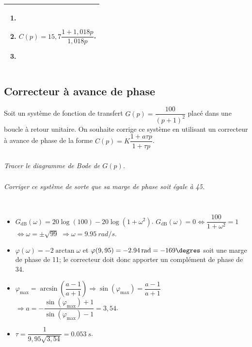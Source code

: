 \documentclass[10pt,fleqn]{article} %
\begin{document}
\begin{multicols}{2}
\noindent
\begin{tabular}{|p{.9\linewidth}|}
\hline
\begin{enumerate}
\item $\quad$
\item $C(p)=15,7\dfrac{1+1,018p}{1,018p}$.
\item $\quad$
\end{enumerate}\\
\hline
\end{tabular}





\subsection*{Correcteur à avance de phase}
\setcounter{exo}{0}
Soit un système de fonction de transfert $G(p)=\dfrac{100}{\left(p+1\right)^2}$ placé dans une boucle à retour unitaire. On souhaite corrige ce système en utilisant un correcteur à avance de phase de la forme $C(p)=K\dfrac{1+a\tau p}{1+\tau p}$.


\subparagraph{}\textit{Tracer le diagramme de Bode de $G(p)$.}


\subparagraph{}\textit{Corriger ce système de sorte que sa marge de phase soit égale à 45\degres.}
\ifprof
\begin{corrige}~\\
\begin{itemize}
\item $G_{\text{dB}}(\omega)=20\log \left(100\right)-20\log\left(1+\omega^2\right)$. $G_{\text{dB}}(\omega)=0 \Leftrightarrow \dfrac{100}{1+\omega^2}=1$ $  \Leftrightarrow \omega=\pm\sqrt{99}$ $\Rightarrow \omega=\SI{9,95}{rad/s}$.
\item $\varphi(\omega)=-2\arctan\omega$ et $\varphi(9,95)=-\SI{2,94}{rad}=-169\degres$ soit une marge de phase de 11\degres; le correcteur doit donc apporter un complément de phase de 34\degres. 
\item $\varphi_{\text{max}}=\arcsin\left( \dfrac{a-1}{a+1}\right)\Rightarrow \sin \left(\varphi_{\text{max}}\right)=\dfrac{a-1}{a+1}$ 
$\Rightarrow a=-\dfrac{\sin \left(\varphi_{\text{max}}\right)+1}{ \sin \left(\varphi_{\text{max}}\right) -1}=3,54$.
\item $\tau=\dfrac{1}{9,95\sqrt{3,54}}=\SI{0,053}{s}$.
\end{itemize}
\end{corrige}
\else
\fi



\end{multicols}
\end{document}
